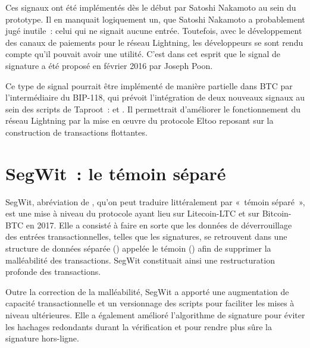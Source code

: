 
Ces signaux ont été implémentés dès le début par Satoshi Nakamoto au sein du prototype. Il en manquait logiquement un, que Satoshi Nakamoto a probablement jugé inutile~: celui qui ne signait aucune entrée. Toutefois, avec le développement des canaux de paiements pour le réseau Lightning, les développeurs se sont rendu compte qu'il pouvait avoir une utilité. C'est dans cet esprit que le signal de signature  a été proposé en février 2016 par Joseph Poon.

Ce type de signal pourrait être implémenté de manière partielle dans BTC par l'intermédiaire du BIP-118, qui prévoit l'intégration de deux nouveaux signaux au sein des scripts de Taproot~:  et . Il permettrait d'améliorer le fonctionnement du réseau Lightning par la mise en œuvre du protocole Eltoo reposant sur la construction de transactions flottantes.

\section*{SegWit~: le témoin séparé}

SegWit, abréviation de , qu'on peut traduire littéralement par «~témoin séparé~», est une mise à niveau du protocole ayant lieu sur Litecoin-LTC et sur Bitcoin-BTC en 2017. Elle a consisté à faire en sorte que les données de déverrouillage des entrées transactionnelles, telles que les signatures, se retrouvent dans une structure de données séparée () appelée le témoin () afin de supprimer la malléabilité des transactions. SegWit constituait ainsi une restructuration profonde des transactions.

Outre la correction de la malléabilité, SegWit a apporté une augmentation de capacité transactionnelle et un versionnage des scripts pour faciliter les mises à niveau ultérieures. Elle a également amélioré l'algorithme de signature pour éviter les hachages redondants durant la vérification et pour rendre plus sûre la signature hors-ligne.

